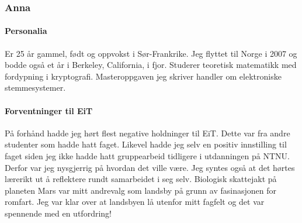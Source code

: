 \subsubsection{Anna}

\paragraph{Personalia}
Er 25 år gammel, født og oppvokst i Sør-Frankrike. Jeg flyttet til Norge i 2007 og bodde også et år i Berkeley, California, i fjor.
Studerer teoretisk matematikk med fordypning i kryptografi. Masteroppgaven jeg skriver handler om elektroniske stemmesystemer.

\paragraph{Forventninger til EiT}
På forhånd hadde jeg hørt flest negative holdninger til EiT.
Dette var fra andre studenter som hadde hatt faget.
Likevel hadde jeg selv en positiv innstilling til faget siden jeg ikke hadde hatt gruppearbeid tidligere i utdanningen på NTNU.
Derfor var jeg nysgjerrig på hvordan det ville være.
Jeg syntes også at det hørtes lærerikt ut å reflektere rundt samarbeidet i seg selv.
Biologisk skattejakt på planeten Mars var mitt andrevalg som landsby på grunn av fasinasjonen for romfart.
Jeg var klar over at landsbyen lå utenfor mitt fagfelt og det var spennende med en utfordring!